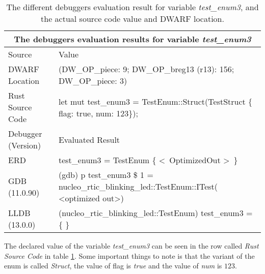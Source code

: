 \begin{table}[h]
	\centering
	\small
	\begin{tabular}{ |p{2cm}|p{8cm}|  }
		\hline
		\multicolumn{2}{|c|}{\textbf{The debuggers evaluation results for variable \emph{test\_enum3}}} \\ 
		\hline
		\hline
		Source & Value \\
		\hline

		DWARF Location & (DW\_OP\_piece: 9; DW\_OP\_breg13 (r13): 156; DW\_OP\_piece: 3) \\

		Rust Source Code & let mut test\_enum3 = TestEnum::Struct(TestStruct \{ flag: true, num: 123\}); \\
		\hline
		\hline
		Debugger (Version) & Evaluated Result \\
		\hline
		ERD & test\_enum3 = 
		TestEnum \{ \textless \ OptimizedOut \textgreater \ \}\\

		GDB (11.0.90)  & (gdb) p test\_enum3\newline
		\$ 1 = nucleo\_rtic\_blinking\_led::TestEnum::ITest(\newline
		\textless optimized out\textgreater) \\

		LLDB (13.0.0) & (nucleo\_rtic\_blinking\_led::TestEnum) test\_enum3 = \{\newline
		\text{\ \ ITest = (0 = 0)}\newline
		\text{\ \ UTest = (0 = 0)}\newline
		\text{\ \ Struct = \{}\newline
		\text{\ \ \ \ 0 = (flag = false, num = 0)}\newline
		\text{\ \ \}}\newline
		\text{\ \ Non = \{\}}\newline
		\} \\
		\hline
	\end{tabular}
	\caption{The different debuggers evaluation result for variable \emph{test\_enum3}, and the actual source code value and DWARF location.}
	\label{table:enum3}
\end{table}


The declared value of the variable \emph{test\_enum3} can be seen in the row called \emph{Rust Source Code} in table \ref{table:enum3}.
Some important things to note is that the variant of the enum is called \emph{Struct}, the value of flag is \emph{true} and the value of \emph{num} is $123$.


